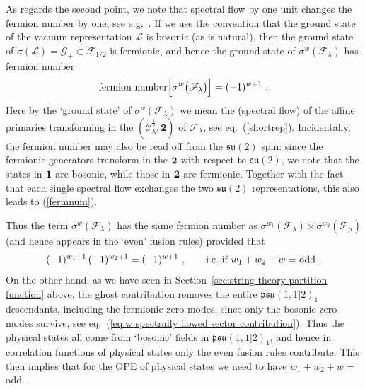 \documentclass[12pt,a4paper]{article}
\newcommand{\be}{\begin{equation}}
\newcommand{\ee}{\end{equation}}
\begin{document}
As regards the second point, we note that spectral flow by one unit changes the fermion number by one, see e.g.\ \cite{Ferreira:2017pgt}. If we use the convention that the ground state of the vacuum representation $\mathscr{L}$ is bosonic (as is natural), then the ground state of $\sigma(\mathscr{L})=\mathscr{G}_+ \subset \mathscr{F}_{1/2}$ is fermionic, and hence the ground state of $\sigma^w( \mathscr{F}_{\lambda}  )$ has fermion number 
\be\label{fermnum}
\hbox{fermion number} \Bigl[ \sigma^w\bigl( \mathscr{F}_{\lambda}  \bigr)  \Bigr] = (-1)^{w+1} \ . 
\ee
Here by the `ground state' of $\sigma^w(\mathscr{F}_{\lambda})$ we mean the (spectral flow) of the affine primaries transforming in the $(\mathscr{C}^{\frac{1}{2}}_\lambda,\mathbf{2})$ of $\mathscr{F}_{\lambda}$, see eq.~(\ref{shortrep}). Incidentally, the fermion number may also be read off from the $\mathfrak{su}(2)$ spin: since the fermionic generators transform in the ${\bf 2}$ with respect to $\mathfrak{su}(2)$, we note that the states in ${\bf 1}$ are bosonic, while those in ${\bf 2}$ are fermionic. Together with the fact that each single spectral flow exchanges the two $\mathfrak{su}(2)$ representations, this also leads to (\ref{fermnum}).

Thus the term $\sigma^w( \mathscr{F}_{\lambda})$ has the same fermion number as 
$\sigma^{w_1}( \mathscr{F}_{\lambda}) \times \sigma^{w_2}( \mathscr{F}_{\mu})$ (and hence appears in the `even' fusion rules) provided that 
\be
(-1)^{w_1+1} \, (-1)^{w_2+1} = (-1)^{w+1} \ , \qquad \hbox{i.e.\ if $w_1 + w_2 + w = $ odd} \ . 
\ee
On the other hand, as we have seen in Section~\ref{sec:string theory partition function} above,  the ghost contribution removes the entire $\mathfrak{psu}(1,1|2)_1$ descendants, including the fermionic zero modes, since only the bosonic zero modes survive, see eq.~(\ref{eq:w spectrally flowed sector contribution}). Thus the physical states all come from `bosonic' fields in $\mathfrak{psu}(1,1|2)_1$, and hence in correlation functions of physical states only the even fusion rules contribute. This then implies that for the OPE of physical states we need to have $w_1 + w_2 + w = $ odd. 
\end{document}

